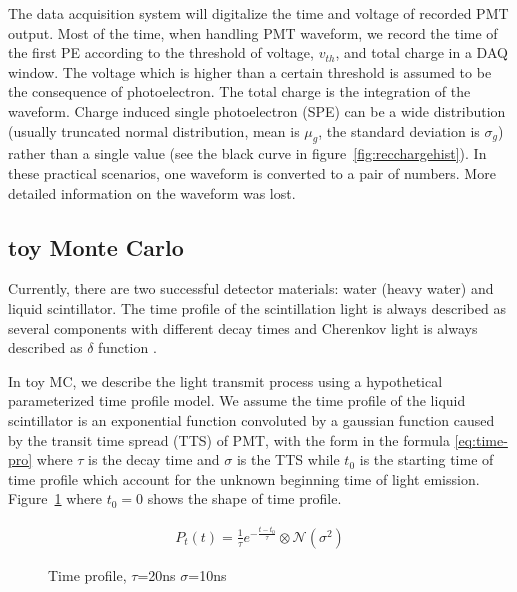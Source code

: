 The data acquisition system will digitalize the time and voltage of recorded PMT output. Most of the time, when handling PMT waveform, we record the time of the first PE according to the threshold of voltage, $v_{th}$, and total charge in a DAQ window. The voltage which is higher than a certain threshold is assumed to be the consequence of photoelectron. The total charge is the integration of the waveform. Charge induced single photoelectron (SPE) can be a wide distribution (usually truncated normal distribution, mean is $\mu_{g}$, the standard deviation is $\sigma_{g}$) rather than a single value (see the black curve in figure~\ref{fig:recchargehist}). In these practical scenarios, one waveform is converted to a pair of numbers. More detailed information on the waveform was lost. 

\subsection{toy Monte Carlo}

Currently, there are two successful detector materials: water (heavy water) and liquid scintillator. The time profile of the scintillation light is always described as several components with different decay times and Cherenkov light is always described as $\delta$ function \cite{ludhova_particle_2020}. 

In toy MC, we describe the light transmit process using a hypothetical parameterized time profile model. We assume the time profile of the liquid scintillator is an exponential function convoluted by a gaussian function \cite{li_separation_2016} caused by the transit time spread (TTS) of PMT, with the form in the formula \eqref{eq:time-pro} where $\tau$ is the decay time and $\sigma$ is the TTS while $t_{0}$ is the starting time of time profile which account for the unknown beginning time of light emission. Figure~\ref{fig:time-pro} where $t_{0}=0$ shows the shape of time profile. 

\begin{minipage}{.4\textwidth}
\begin{align}
    P_{t}(t) = \frac{1}{\tau}e^{-\frac{t - t_{0}}{\tau}} \otimes \mathcal{N}(\sigma^{2})
    \label{eq:time-pro}
\end{align}
\end{minipage}
\begin{minipage}{.6\textwidth}
\begin{figure}[H]
    \centering
    \resizebox{\textwidth}{!}{}
    \caption{\label{fig:time-pro} Time profile, $\tau$=20ns $\sigma$=10ns}
\end{figure}
\end{minipage}

